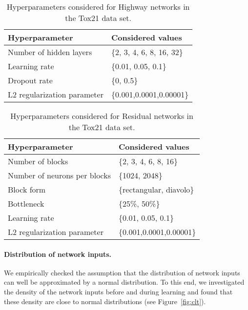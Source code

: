 \documentclass{article}
\begin{document}
\begin{table}[htp]
\begin{center}
\caption{Hyperparameters considered for Highway networks in the Tox21 data set.}

\begin{tabular}{ll}
\toprule
Hyperparameter  & Considered values \\ 
\midrule
  Number of hidden layers & \{2, 3, 4, 6, 8, 16, 32\} \\
  Learning rate & \{0.01, 0.05, 0.1\} \\
  Dropout rate & \{0, 0.5\} \\
  L2 regularization parameter &  \{0.001,0.0001,0.00001\} \\
\bottomrule
\end{tabular}
\end{center}

\end{table}




\begin{table}[htp]
\begin{center}
\caption{Hyperparameters considered for Residual networks in the Tox21 data set.}
\begin{tabular}{ll}
\toprule
Hyperparameter  & Considered values \\ 
\midrule
  Number of blocks & \{2, 3, 4, 6, 8, 16\} \\
  Number of neurons per blocks & \{1024, 2048\} \\
  Block form & \{rectangular, diavolo\} \\
  Bottleneck & \{25\%, 50\%\} \\
  Learning rate & \{0.01, 0.05, 0.1\} \\
  L2 regularization parameter &  \{0.001,0.0001,0.00001\} \\
\bottomrule
\end{tabular}
\end{center}
\end{table}



\clearpage

\paragraph{Distribution of network inputs.}
We empirically checked the assumption that the distribution of network inputs can 
well be approximated by a normal distribution. To this end, we investigated the 
density of the network inputs before and during learning and found that 
these density are close to normal distributions (see Figure~\ref{fig:clt}).
\end{document}
